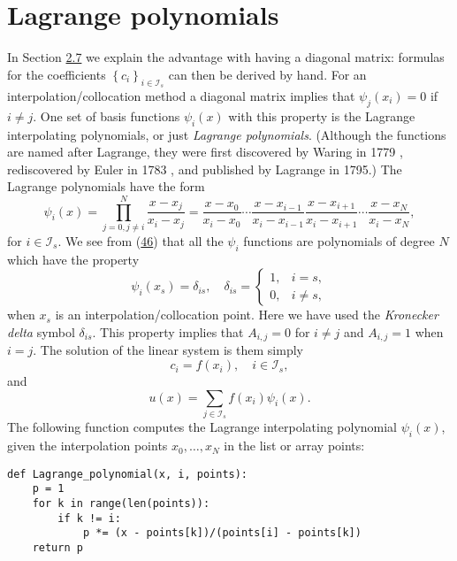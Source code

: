\documentclass[../main.tex]{subfiles}
\begin{document}
\section[Lagrange polynomials]{Lagrange polynomials}
\label{sec:sec_2_11}
\noindent In Section \hyperref[sec:sec_2_7]{2.7} we explain the advantage with having a diagonal matrix: formulas for the coefficients $\left\{c_{i}\right\}_{i \in \mathcal{I}_{s}}$ can then be derived by hand. For an interpolation/collocation method a diagonal matrix implies that $\psi_{j}\left(x_{i}\right)=0$ if $i \neq j$. One set of basis functions $\psi_{i}(x)$ with this property is the Lagrange interpolating polynomials, or just \textit{Lagrange polynomials}. (Although the functions are named after Lagrange, they were first discovered by Waring in 1779 , rediscovered by
Euler in 1783 , and published by Lagrange in 1795.) The Lagrange polynomials have the form
\begin{equation}\label{eqa46}
	\psi_{i}(x)=\prod_{j=0, j \neq i}^{N} \frac{x-x_{j}}{x_{i}-x_{j}}=\frac{x-x_{0}}{x_{i}-x_{0}} \cdots \frac{x-x_{i-1}}{x_{i}-x_{i-1}} \frac{x-x_{i+1}}{x_{i}-x_{i+1}} \cdots \frac{x-x_{N}}{x_{i}-x_{N}},
\end{equation}
for $i \in \mathcal{I}_{s}$. We see from (\hyperref[eqa46]{46}) that all the $\psi_{i}$ functions are polynomials of degree $N$ which have the property
\begin{equation}\label{eqa47}
	\psi_{i}\left(x_{s}\right)=\delta_{i s}, \quad \delta_{i s}= \begin{cases}1, & i=s, \\ 0, & i \neq s,\end{cases}
\end{equation}
when $x_{s}$ is an interpolation/collocation point. Here we have used the \textit{Kronecker delta} symbol $\delta_{i s}$. This property implies that $A_{i, j}=0$ for $i \neq j$ and $A_{i, j}=1$ when $i=j$. The solution of the linear system is them simply
\begin{equation}\label{eqa48}
	c_{i}=f\left(x_{i}\right), \quad i \in \mathcal{I}_{s},
\end{equation}
and
\begin{equation}\label{eqa49}
	u(x)=\sum_{j \in \mathcal{I}_{s}} f\left(x_{i}\right) \psi_{i}(x).
\end{equation}
The following function computes the Lagrange interpolating polynomial $\psi_{i}(x)$, given the interpolation points $x_{0}, \ldots, x_{N}$ in the list or array points:
\begin{lstlisting}[numbers=none]
def Lagrange_polynomial(x, i, points):
	p = 1
	for k in range(len(points)):
		if k != i:
			p *= (x - points[k])/(points[i] - points[k])
	return p
\end{lstlisting}
\end{document}
